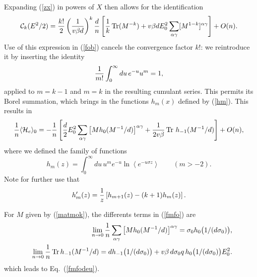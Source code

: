 Expanding (\ref{zx}) in powers of $X$ then allows for the identification
\begin{equation}
{\cal{C}}_k(E^2/2)={k!\over 2}\left({1\over v\beta d}\right)^k \frac{d}{n}\left[{1\over k}\mathop{\text{Tr}} (M^{-k})+{v\beta d} E_0^2 \sum_{\alpha\gamma} [M^{1-k}]^{\alpha\gamma}\right]+O(n).
\end{equation}
Use of this expression in (\ref{fob}) cancels the convergence factor
$k!$: we reintroduce it by inserting the identity
\begin{equation}
{1\over m!}\int_0^\infty du\, e^{-u} u^m =1,
\end{equation}
applied to $m=k-1$ and $m=k$ in the resulting cumulant series. This
permits its Borel summation, which brings in the functions $h_m(x)$
defined by (\ref{hm}). This results in
\begin{equation}
\label{fmfo}
{1\over n}
\langle{\cal{H}}_e\rangle_0
=-{1\over n}
\left[  {d\over 2}E_0^2 \sum_{\alpha\gamma}\left[ M h_0(M^{-1}/d)\right]^{\alpha\gamma} +{1\over 2 v \beta}\mathop{\text{Tr}}\, h_{-1}(M^{-1}/d) \right]+O(n),
\end{equation}
where we defined the family of functions
\begin{equation}
\label{hm}
h_m(z)=\int_0^\infty du\,u^m e^{-u} \ln\left\langle e^{-u\sigma z}\right\rangle\qquad(m>-2).
\end{equation}
Note for further use that
\begin{equation}
\label{deriv}
h_m'(z)={1\over z}\left[h_{m+1}(z)-(k+1)h_{m}(z)\right].
\end{equation}

For $M$ given by (\ref{matmok}), the differents terms in (\ref{fmfo}) are
\begin{eqnarray}
&&\lim_{n\to 0}{1\over n} \sum_{\alpha\gamma} \left[M h_0(M^{-1}/d)\right]^{\alpha\gamma}=\sigma_0 h_0
\bigl(1/(d\sigma_0)\bigr),
\nonumber\\
&&\lim_{n\to 0}{1\over n}\mathop{\text{Tr}}
h_{-1}(M^{-1}/d)=dh_{-1}\bigl(1/(d\sigma_0)\bigr)+v\beta\, d\sigma_0 q\, h_0 \bigl(1/(d\sigma_0)\bigr)E_0^2.
\end{eqnarray}
which leads to Eq.\ (\ref{fmfodeu}).

